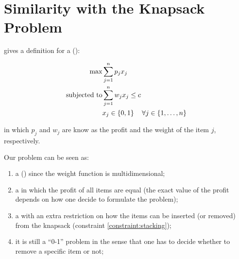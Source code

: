\section{Similarity with the Knapsack Problem}

\cite{bib:knapsack-problems} gives a definition for a \zoKPV (\zoKP):

\begin{eqnarray}
	\label{problem:knapsack-problem}
	\max & \displaystyle\sum\limits_{j=1}^{n} p_j x_j \\
	\mbox{subjected to}
		& \displaystyle\sum\limits_{j=1}^{n} w_j x_j \leq c \nonumber\\
		& x_j \in \left\{0, 1\right\} \quad \forall j \in \left\{1, \dots, n\right\} \nonumber
\end{eqnarray}

in which $p_j$ and $w_j$ are know as the profit and the weight of the item $j$, respectively.

Our problem can be seen as:

\begin{enumerate}
	\item a \MKPV (\MKP) since the weight function is multidimensional;
	\item a \zoKP in which the profit of all items are equal (the exact value of the profit depends on how one decide to formulate the problem);
	\item a \zoKP with an extra restriction on how the items can be inserted (or removed) from the knapsack (constraint \eqref{constraint:stacking});
	\item it is still a ``0-1'' problem in the sense that one has to decide whether to remove a specific item or not;
\end{enumerate}
